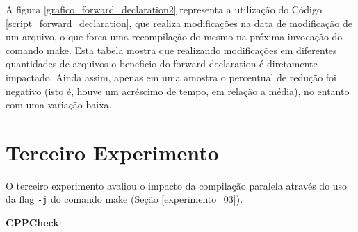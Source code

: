 A figura \ref{grafico_forward_declaration2} representa a utilização
 do Código \ref{script_forward_declaration},
 que realiza modificações na data de modificação de um arquivo, o que forca uma
 recompilação do mesmo na próxima invocação do comando make.
 Esta tabela mostra que realizando modificações em diferentes
 quantidades de arquivos o beneficio do forward declaration é
 diretamente impactado. Ainda assim, apenas em uma amostra o percentual
 de redução foi negativo  (isto é, houve um acréscimo de tempo,
 em relação a média), no entanto com uma variação baixa.



\section{Terceiro Experimento}

O terceiro experimento avaliou o impacto da compilação
 paralela através do uso da flag \texttt{-j} do
 comando make (Seção \ref{experimento_03}).



\textbf{CPPCheck}:


